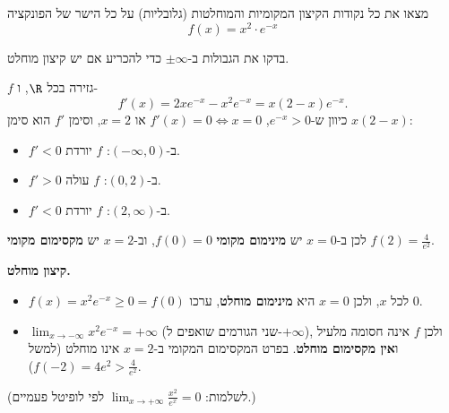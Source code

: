 
\begin{question}
מצאו את כל נקודות הקיצון המקומיות והמוחלטות (גלובליות) על כל הישר של הפונקציה
\[ f(x)=x^2\cdot e^{-x} \]
\end{question}

\begin{hint}
בדקו את הגבולות ב-$\pm\infty$ כדי להכריע אם יש קיצון מוחלט.
\end{hint}

\begin{solution}
$f$ גזירה בכל $\R$, ו-
\[ f'(x)=2xe^{-x}-x^2e^{-x}=x(2-x)e^{-x}. \]
כיוון ש-$e^{-x}>0$, $f'(x)=0\iff x=0$ או $x=2$, וסימן $f'$ הוא סימן $x(2-x)$:
\begin{itemize}
  \item $f'<0$ ב-$(-\infty,0)$: $f$ יורדת.
  \item $f'>0$ ב-$(0,2)$: $f$ עולה.
  \item $f'<0$ ב-$(2,\infty)$: $f$ יורדת.
\end{itemize}
לכן ב-$x=0$ יש \textbf{מינימום מקומי} $f(0)=0$, וב-$x=2$ יש \textbf{מקסימום מקומי} $f(2)=\frac{4}{e^2}$.

\textbf{קיצון מוחלט.}
\begin{itemize}
  \item $f(x)=x^2e^{-x}\ge0=f(0)$ לכל $x$, ולכן $x=0$ היא \textbf{מינימום מוחלט}, ערכו $0$.
  \item $\lim_{x\to-\infty}x^2e^{-x}=+\infty$ (שני הגורמים שואפים ל-$+\infty$), ולכן $f$ אינה חסומה מלעיל ו\textbf{אין מקסימום מוחלט}. בפרט המקסימום המקומי ב-$x=2$ אינו מוחלט (למשל $f(-2)=4e^2>\frac4{e^2}$).
\end{itemize}
(לשלמות: $\lim_{x\to+\infty}\frac{x^2}{e^x}=0$ לפי לופיטל פעמיים.)
\end{solution}
